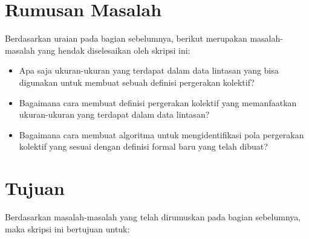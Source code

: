 \iffalse

\lionov{tambahin bahwa setelah itu akan dilakukan eksperimen dengan data nyata lintasan yang tersedia di internet (lihat bab 5 di thesis) dan akan dibandingkan hasilnya dengan hasil dari eksperimen sebelumnya (jangna lupa jelasin bahwa di eksperimen sebelumnya, yang dibandingkan itu cuma grup, gak ngebandingin tempat dan waktu). Terus harus disinggung bahwa di data eksperimen itu, udah ada grup yang ditentukan oleh manusia, jadi nanti hasil program akan dibandingkan dengan kunci jawabannya.} \cristopher{Di atas kan udah saya sebuat kalo identifikasinya akan diuji dengan dibandingkan, kalo gitu kudu rephrase atau biarin ajah ko?}

\fi

\section{Rumusan Masalah}
\label{sec:rumusan}

Berdasarkan uraian pada bagian sebelumnya, berikut merupakan masalah-masalah yang hendak diselesaikan oleh skripsi ini:
\iffalse

\lionov{masalah pertama itu ukuran apa saja yang bisa digunakan, kedua bagaimana membuat model pergerakan kolektif yang memanfaatkan ukuran lintasan, yang ketiga bagaimana membuat algoritmanya. Soalnya yang poin 2 dan 3 kan gak dilakukan, elu gak ngebahas berbagai definisi formal, ukuran, teknik, dan algoritma (karena pertanyaannya ``apa aja''}

\fi
\begin{itemize}
    \item Apa saja ukuran-ukuran yang terdapat dalam data lintasan yang bisa digunakan untuk membuat sebuah definisi pergerakan kolektif?
    \item Bagaimana cara membuat definisi pergerakan kolektif yang memanfaatkan ukuran-ukuran yang terdapat dalam data lintasan?
    \item Bagaimana cara membuat algoritma untuk mengidentifikasi pola pergerakan kolektif yang sesuai dengan definisi formal baru yang telah dibuat?
\end{itemize}

\section{Tujuan}
\label{sec:tujuan}  

Berdasarkan masalah-masalah yang telah dirumuskan pada bagian sebelumnya, maka skripsi ini bertujuan untuk:


